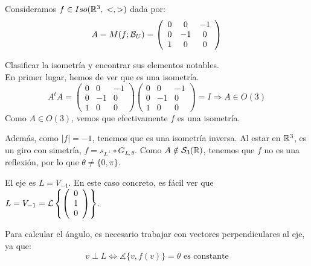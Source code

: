 \begin{ejercicio}
    Consideramos $f\in Iso(\mathbb{R}^3,\;<,>)$ dada por:
    \begin{equation*}
        A=M(f;\mathcal{B}_U) = \left(\begin{array}{ccc}
            0 & 0 & -1\\
            0 & -1 & 0 \\
            1 & 0 & 0
        \end{array}\right)
    \end{equation*}
    
    Clasificar la isometría y encontrar sus elementos notables.\\

    En primer lugar, hemos de ver que es una isometría. 
    \begin{equation*}
        A^tA=\left(\begin{array}{ccc}
            0 & 0 & -1\\
            0 & -1 & 0 \\
            1 & 0 & 0
        \end{array}\right)\left(\begin{array}{ccc}
            0 & 0 & -1\\
            0 & -1 & 0 \\
            1 & 0 & 0
        \end{array}\right)=I \Longrightarrow A\in O(3)   
    \end{equation*}
    Como $A\in O(3)$, vemos que efectivamente $f$ es una isometría.
    

    Además, como $|f|=-1$, tenemos que es una isometría inversa. Al estar en $\mathbb{R}^3$, es un giro con simetría, $f=s_{L^\perp}\circ G_{L,\theta}$. Como $A\notin \mathcal{S}_3(\mathbb{R})$, tenemos que $f$ no es una reflexión, por lo que $\theta\neq\{0, \pi\}$.

    El eje es $L=V_{-1}$. En este caso concreto, es fácil ver que $L=V_{-1}=\mathcal{L}\left\{\left(\begin{array}{c}
            0\\1\\0
        \end{array}\right)\right\}$.

    Para calcular el ángulo, es necesario trabajar con vectores perpendiculares al eje, ya que:
    \begin{equation*}
        v\perp L \Longleftrightarrow \measuredangle\{v,f(v)\}=\theta \text{ es constante}
    \end{equation*}


\end{ejercicio}
